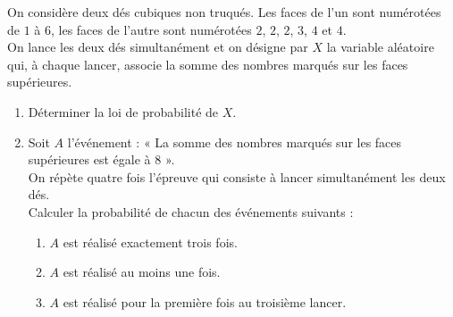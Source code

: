 \documentclass{axiobac}
\begin{document}
\entete

\begin{exercice}{}

On considère deux dés cubiques non truqués. Les faces de l'un sont numérotées de $1$ à $6$, les faces de l'autre sont numérotées $2$, $2$, $2$, $3$, $4$ et $4$. \\
On lance les deux dés simultanément et on désigne par $X$ la variable aléatoire qui, à chaque lancer, associe la somme des nombres marqués sur les faces supérieures.

\begin{enumerate}
    \item Déterminer la loi de probabilité de $X$.
    \item Soit $A$ l'événement : « La somme des nombres marqués sur les faces supérieures est égale à $8$ ». \\
    On répète quatre fois l'épreuve qui consiste à lancer simultanément les deux dés. \\
    Calculer la probabilité de chacun des événements suivants :
    \begin{enumerate}
        \item $A$ est réalisé exactement trois fois.
        \item $A$ est réalisé au moins une fois.
        \item $A$ est réalisé pour la première fois au troisième lancer.
    \end{enumerate}
\end{enumerate}

\end{exercice}
\end{document}
